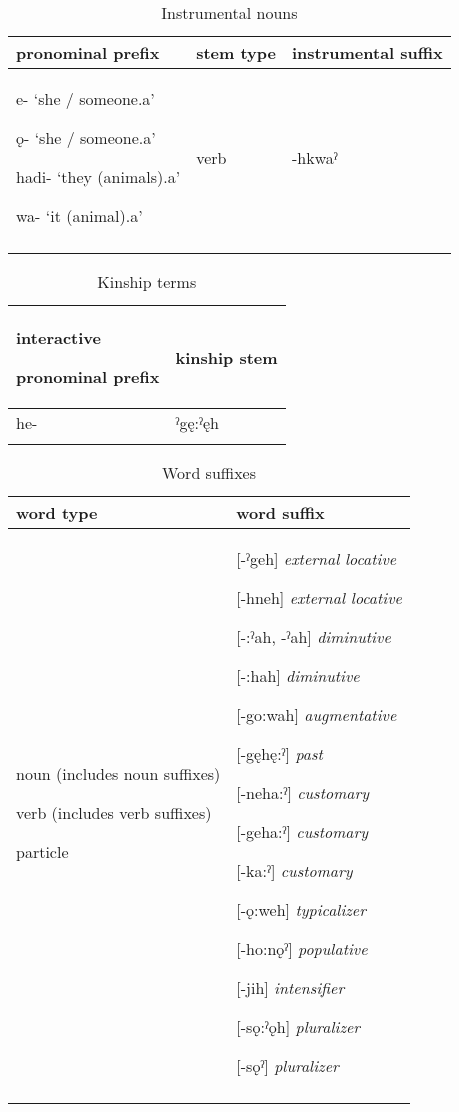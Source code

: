 \begin{table}
\caption{Instrumental nouns}
\label{tab:1:instrumentalnoun}
\scriptsize{
\begin{tabularx}{.75\textwidth}{XXX}
\lsptoprule
pronominal prefix & stem type & instrumental suffix\\
\midrule
e- ‘she / someone.a’

ǫ- ‘she / someone.a’

hadi- ‘they (animals).a’

wa- ‘it (animal).a’ & verb & {}-hkwaˀ\\
\lspbottomrule
\end{tabularx}}
\end{table}



\begin{table}
\caption{Kinship terms}
\label{tab:1:kinshipterm}
\scriptsize{
\begin{tabularx}{.5\textwidth}{XX}
\lsptoprule
interactive 

pronominal prefix & kinship stem\\
\midrule
he- & ˀgę:ˀęh\\
\lspbottomrule
\end{tabularx}}
\end{table}

\lipsum[1-1]



\begin{table}
\caption{Word suffixes}
\label{tab:1:wordsuffix}
\scriptsize{
\begin{tabularx}{.75\textwidth}{XX}

\lsptoprule
word type & word suffix\\
\midrule
noun (includes noun suffixes)

verb (includes verb suffixes)

particle & [-ˀgeh] \textit{external locative}

[-hneh] \textit{external locative}

[-:ˀah, -ˀah] \textit{diminutive} 

[-:hah] \textit{diminutive} 

[-go:wah] \textit{augmentative}

[-gęhę:ˀ] \textit{past} 

[-neha:ˀ] \textit{customary} 

[-geha:ˀ] \textit{customary} 

[-ka:ˀ] \textit{customary} 

[-ǫ:weh] \textit{typicalizer} 

[-ho:nǫˀ] \textit{populative}

[-jih] \textit{intensifier}

[-sǫ:ˀǫh] \textit{pluralizer}

[-sǫˀ] \textit{pluralizer}\\
\lspbottomrule
\end{tabularx}}
\end{table}



